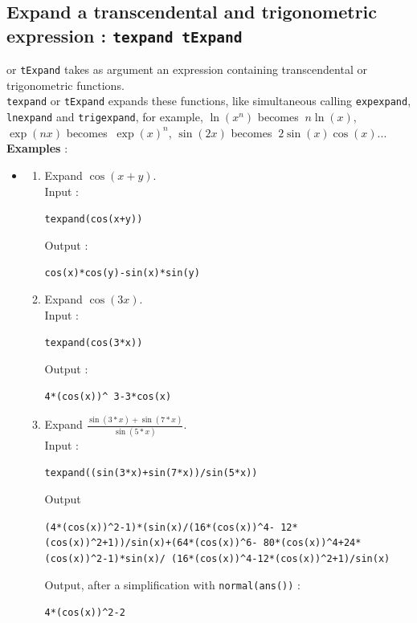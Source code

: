 \documentclass[a4paper,11pt]{book}
\begin{document}
\subsection{Expand a transcendental and trigonometric expression : {\tt texpand tExpand}}
 or {\tt tExpand} takes as argument an
expression containing transcendental or trigonometric functions.\\
{\tt texpand} or {\tt tExpand} expands these functions, like simultaneous
calling {\tt expexpand}, {\tt lnexpand} and {\tt trigexpand}, 
for example,  $\ln(x^n)$ becomes $\ n\ln(x)$, $\exp(nx)$ 
becomes $\ \exp(x)^n$, $\sin(2x)$ becomes $\ 2\sin(x)\cos(x)$...\\
{\bf Examples} :\\
\begin{itemize}
\item
\begin{enumerate}
\item Expand $\cos(x+y)$.\\
Input :
\begin{center}{\tt texpand(cos(x+y))}\end{center}
Output :
\begin{center}{\tt cos(x)*cos(y)-sin(x)*sin(y)}\end{center}
\item Expand $\cos(3x)$.\\
Input :
\begin{center}{\tt texpand(cos(3*x))}\end{center}
Output :
\begin{center}{\tt 4*(cos(x))\verb|^| 3-3*cos(x)}\end{center}
\item Expand $\displaystyle \frac{\sin(3*x)+\sin(7*x)}{\sin(5*x)}$.\\
Input :
\begin{center}{\tt texpand((sin(3*x)+sin(7*x))/sin(5*x))}\end{center}
Output
\begin{center}{\tt (4*(cos(x))\verb|^|2-1)*(sin(x)/(16*(cos(x))\verb|^|4- 12*(cos(x))\verb|^|2+1))/sin(x)+(64*(cos(x))\verb|^|6- 80*(cos(x))\verb|^|4+24*(cos(x))\verb|^|2-1)*sin(x)/ (16*(cos(x))\verb|^|4-12*(cos(x))\verb|^|2+1)/sin(x)}\end{center}
Output, after a simplification with {\tt normal(ans())} :
\begin{center}{\tt 4*(cos(x))\verb|^|2-2}\end{center}

\end{enumerate}
\end{itemize}
\end{document}
